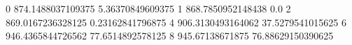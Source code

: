 0 874.1488037109375 5.36370849609375
1 868.7850952148438 0.0
2 869.0167236328125 0.23162841796875
4 906.3130493164062 37.5279541015625
6 946.4365844726562 77.6514892578125
8 945.67138671875 76.88629150390625
